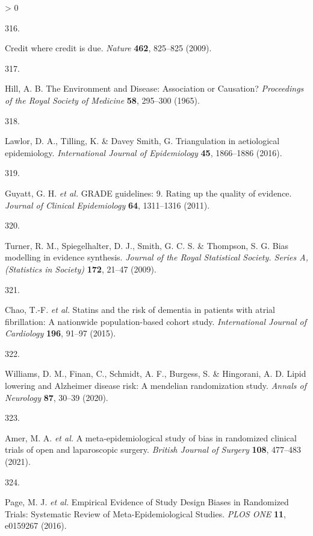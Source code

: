 \documentclass[a4paper, twoside]{templates/ociamthesis}
\newlength{\cslhangindent}
\newlength{\csllabelwidth}
\newenvironment{CSLReferences}[3] %
 {%
  \setlength{\parindent}{0pt}
  \ifodd #1 \everypar{\setlength{\hangindent}{\cslhangindent}}\ignorespaces\fi
  \ifnum #2 > 0
  \setlength{\parskip}{#2\baselineskip}
  \fi
 }%
 {}
\newcommand{\CSLLeftMargin}[1]{\parbox[t]{\maxof{\widthof{#1}}{\csllabelwidth}}{#1}}
\newcommand{\CSLRightInline}[1]{\parbox[t]{\linewidth - \csllabelwidth}{#1}}
\begin{document}
\begin{CSLReferences}{0}{0}
\leavevmode\hypertarget{ref-nature2009}{}%
\CSLLeftMargin{316. }
\CSLRightInline{Credit where credit is due. \emph{Nature} \textbf{462}, 825--825 (2009).}

\leavevmode\hypertarget{ref-hill1965}{}%
\CSLLeftMargin{317. }
\CSLRightInline{Hill, A. B. The {Environment} and {Disease}: Association or {Causation}? \emph{Proceedings of the Royal Society of Medicine} \textbf{58}, 295--300 (1965).}

\leavevmode\hypertarget{ref-lawlor2016}{}%
\CSLLeftMargin{318. }
\CSLRightInline{Lawlor, D. A., Tilling, K. \& Davey Smith, G. Triangulation in aetiological epidemiology. \emph{International Journal of Epidemiology} \textbf{45}, 1866--1886 (2016).}

\leavevmode\hypertarget{ref-guyatt2011}{}%
\CSLLeftMargin{319. }
\CSLRightInline{Guyatt, G. H. \emph{et al.} {GRADE} guidelines: 9. {Rating} up the quality of evidence. \emph{Journal of Clinical Epidemiology} \textbf{64}, 1311--1316 (2011).}

\leavevmode\hypertarget{ref-turner2009}{}%
\CSLLeftMargin{320. }
\CSLRightInline{Turner, R. M., Spiegelhalter, D. J., Smith, G. C. S. \& Thompson, S. G. Bias modelling in evidence synthesis. \emph{Journal of the Royal Statistical Society. Series A, (Statistics in Society)} \textbf{172}, 21--47 (2009).}

\leavevmode\hypertarget{ref-chao2015}{}%
\CSLLeftMargin{321. }
\CSLRightInline{Chao, T.-F. \emph{et al.} Statins and the risk of dementia in patients with atrial fibrillation: A nationwide population-based cohort study. \emph{International Journal of Cardiology} \textbf{196}, 91--97 (2015).}

\leavevmode\hypertarget{ref-williams2020}{}%
\CSLLeftMargin{322. }
\CSLRightInline{Williams, D. M., Finan, C., Schmidt, A. F., Burgess, S. \& Hingorani, A. D. Lipid lowering and {Alzheimer} disease risk: A mendelian randomization study. \emph{Annals of Neurology} \textbf{87}, 30--39 (2020).}

\leavevmode\hypertarget{ref-amer2021}{}%
\CSLLeftMargin{323. }
\CSLRightInline{Amer, M. A. \emph{et al.} A meta-epidemiological study of bias in randomized clinical trials of open and laparoscopic surgery. \emph{British Journal of Surgery} \textbf{108}, 477--483 (2021).}

\leavevmode\hypertarget{ref-page2016}{}%
\CSLLeftMargin{324. }
\CSLRightInline{Page, M. J. \emph{et al.} Empirical {Evidence} of {Study Design Biases} in {Randomized Trials}: Systematic {Review} of {Meta}-{Epidemiological Studies}. \emph{PLOS ONE} \textbf{11}, e0159267 (2016).}


\end{CSLReferences}
\end{document}
